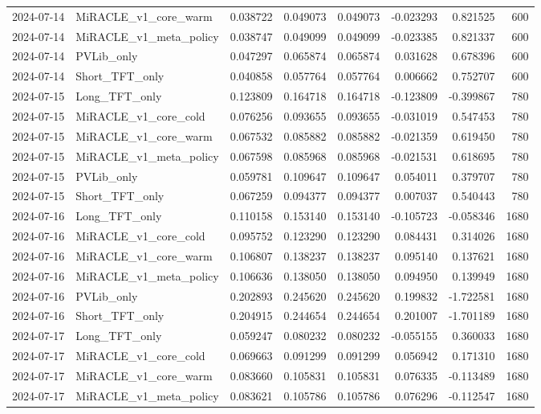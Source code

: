 \begin{tabular}{llrrrrrr}
2024-07-14 & MiRACLE_v1_core_warm & 0.038722 & 0.049073 & 0.049073 & -0.023293 & 0.821525 & 600 \\
2024-07-14 & MiRACLE_v1_meta_policy & 0.038747 & 0.049099 & 0.049099 & -0.023385 & 0.821337 & 600 \\
2024-07-14 & PVLib_only & 0.047297 & 0.065874 & 0.065874 & 0.031628 & 0.678396 & 600 \\
2024-07-14 & Short_TFT_only & 0.040858 & 0.057764 & 0.057764 & 0.006662 & 0.752707 & 600 \\
2024-07-15 & Long_TFT_only & 0.123809 & 0.164718 & 0.164718 & -0.123809 & -0.399867 & 780 \\
2024-07-15 & MiRACLE_v1_core_cold & 0.076256 & 0.093655 & 0.093655 & -0.031019 & 0.547453 & 780 \\
2024-07-15 & MiRACLE_v1_core_warm & 0.067532 & 0.085882 & 0.085882 & -0.021359 & 0.619450 & 780 \\
2024-07-15 & MiRACLE_v1_meta_policy & 0.067598 & 0.085968 & 0.085968 & -0.021531 & 0.618695 & 780 \\
2024-07-15 & PVLib_only & 0.059781 & 0.109647 & 0.109647 & 0.054011 & 0.379707 & 780 \\
2024-07-15 & Short_TFT_only & 0.067259 & 0.094377 & 0.094377 & 0.007037 & 0.540443 & 780 \\
2024-07-16 & Long_TFT_only & 0.110158 & 0.153140 & 0.153140 & -0.105723 & -0.058346 & 1680 \\
2024-07-16 & MiRACLE_v1_core_cold & 0.095752 & 0.123290 & 0.123290 & 0.084431 & 0.314026 & 1680 \\
2024-07-16 & MiRACLE_v1_core_warm & 0.106807 & 0.138237 & 0.138237 & 0.095140 & 0.137621 & 1680 \\
2024-07-16 & MiRACLE_v1_meta_policy & 0.106636 & 0.138050 & 0.138050 & 0.094950 & 0.139949 & 1680 \\
2024-07-16 & PVLib_only & 0.202893 & 0.245620 & 0.245620 & 0.199832 & -1.722581 & 1680 \\
2024-07-16 & Short_TFT_only & 0.204915 & 0.244654 & 0.244654 & 0.201007 & -1.701189 & 1680 \\
2024-07-17 & Long_TFT_only & 0.059247 & 0.080232 & 0.080232 & -0.055155 & 0.360033 & 1680 \\
2024-07-17 & MiRACLE_v1_core_cold & 0.069663 & 0.091299 & 0.091299 & 0.056942 & 0.171310 & 1680 \\
2024-07-17 & MiRACLE_v1_core_warm & 0.083660 & 0.105831 & 0.105831 & 0.076335 & -0.113489 & 1680 \\
2024-07-17 & MiRACLE_v1_meta_policy & 0.083621 & 0.105786 & 0.105786 & 0.076296 & -0.112547 & 1680 \\

\end{tabular}
